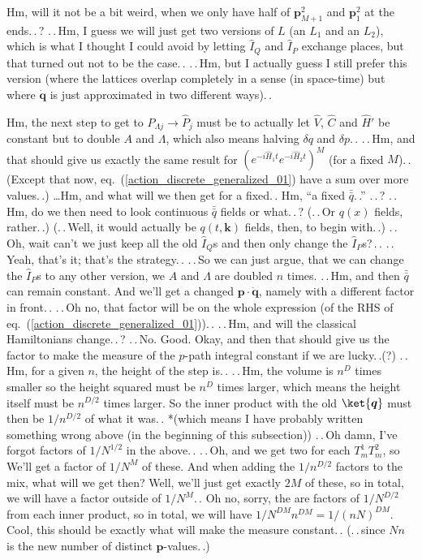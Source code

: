 \documentclass{report}
\begin{document}
Hm, will it not be a bit weird, when we only have half of $\boldsymbol{p}_{M+1}^2$ and $\boldsymbol{p}_{1}^2$ at the ends.\,.\,? %
.\,.\,Hm, I guess we will just get two versions of $L$ (an $L_1$ and an $L_2$), which is what I thought I could avoid by letting $\hat I_Q$ and $\hat I_P$ exchange places, but that turned out not to be the case.\,. .\,.\,Hm, but I actually guess I still prefer this version (where the lattices overlap completely in a sense (in space-time) but where $\dot{\boldsymbol{q}}$ is just approximated in two different ways).\,. %

Hm, the next step to get to $\hat P_{\Lambda j} \to \hat P_j$ must be to actually let $\hat V$, $\hat C$ and $\hat H'$ be constant but to double $A$ and $\Lambda$, which also means halving $\delta q$ and $\delta p$.\,. .\,.\,Hm, and that should give us exactly the same result for $(e^{-i \hat H_1 t} e^{-i \hat H_2 t})^M$ (for a fixed $M$).\,. (Except that now, eq.\ (\ref{action_discrete_generalized_01}) have a sum over more values.\,.) \ldots Hm, and what will we then get for a fixed.\,. Hm, ``a fixed $\bar{\bar{q}}$.\,.'' .\,.\,? .\,.\,Hm, do we then need to look continuous $\bar{\bar{q}}$ fields or what.\,.\,? (.\,.\,Or $q(x)$ fields, rather.\,.) (.\,.\,Well, it would actually be $q(t, \boldsymbol k)$ fields, then, to begin with.\,.) .\,.\,Oh, wait can't we just keep all the old $\hat I_Q$s and then only change the $\hat I_P$s?\,.\,. .\,.\,Yeah, that's it; that's the strategy.\,. .\,.\,So we can just argue, that we can change the $\hat I_P$s to any other version, we $A$ and $\Lambda$ are doubled $n$ times. .\,.\,Hm, and then $\bar{\bar{q}}$ can remain constant. And we'll get a changed $\boldsymbol{p} \cdot \dot{\boldsymbol{q}}$, namely with a different factor in front.\,. .\,.\,Oh no, that factor will be on the whole expression (of the RHS of eq.\ (\ref{action_discrete_generalized_01})).\,. .\,.\,Hm, and will the classical Hamiltonians change.\,.\,? .\,.\,No. Good. Okay, and then that should give us the factor to make the measure of the $p$-path integral constant if we are lucky.\,.(?) .\,.\,Hm, for a given $n$, the height of the step is.\,. .\,.\,Hm, the volume is $n^D$ times smaller so the height squared must be $n^D$ times larger, which means the height itself must be $n^{D/2}$ times larger. So the inner product with the old $\ket{\boldsymbol{q}}$ must then be $1/n^{D/2}$ of what it was.\,. *(which means I have probably written something wrong above (in the beginning of this subsection)) .\,.\,Oh damn, I've forgot factors of $1/N^{1/2}$ in the above.\,. .\,.\,Oh, and we get two for each $T^1_m T^2_m$, so We'll get a factor of $1/N^M$ of these. And when adding the $1/n^{D/2}$ factors to the mix, what will we get then? Well, we'll just get exactly $2M$ of these, so in total, we will have a factor outside of $1/N^M$.\,. Oh no, sorry, the are factors of $1/N^{D/2}$ from each inner product, so in total, we will have $1/N^{D M}n^{D M} = 1/(n N)^{D M}$. Cool, this should be exactly what will make the measure constant.\,. (.\,.\,since $Nn$ is the new number of distinct $\boldsymbol{p}$-values.\,.) %
\end{document}
